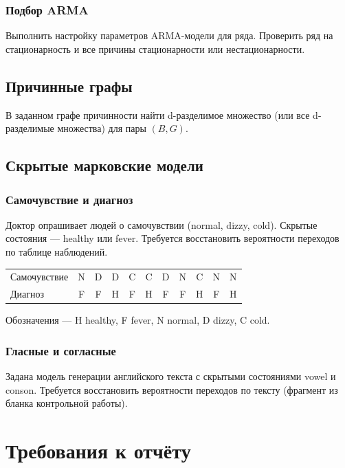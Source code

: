 \subsubsection{Подбор ARMA}

Выполнить настройку параметров ARMA-модели для ряда. Проверить ряд на стационарность и все причины стационарности или нестационарности.

\subsection{Причинные графы}

В заданном графе причинности найти d-разделимое множество (или все d-разделимые множества) для пары $(B, G)$.

\subsection{Скрытые марковские модели}

\subsubsection{Самочувствие и диагноз}

Доктор опрашивает людей о самочувствии (normal, dizzy, cold). Скрытые состояния --- healthy или fever. Требуется восстановить вероятности переходов по таблице наблюдений.

\begin{center}
\small
\begin{tabular}{lcccccccccc}
Самочувствие & N & D & D & C & C & D & N & C & N & N \\
Диагноз & F & F & H & F & H & F & F & H & F & H \\
\end{tabular}
\end{center}

Обозначения --- H healthy, F fever, N normal, D dizzy, C cold.

\subsubsection{Гласные и согласные}

Задана модель генерации английского текста с скрытыми состояниями vowel и conson. Требуется восстановить вероятности переходов по тексту (фрагмент из бланка контрольной работы).

\section{Требования к отчёту}
\label{sec:report-requirements}

